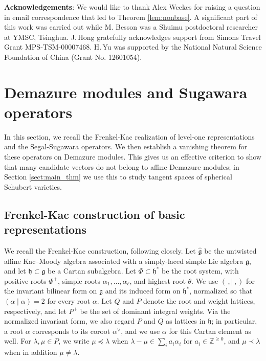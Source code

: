\documentclass[a4paper, 12pt]{amsart}
\theoremstyle{definition}
\begin{document}
 \vspace{0.2cm}

{\bf Acknowledgements}:   We would like to thank Alex Weekes for raising a question in email correspondence that led to Theorem \ref{lem:nonbase}. A significant part of this work was carried out while M. Besson was a Shuimu postdoctoral researcher at YMSC, Tsinghua. J.\,Hong gratefully acknowledges support from Simons
Travel Grant MPS-TSM-00007468.  H.\,Yu was supported by the National Natural Science Foundation of China (Grant No. 12601054).

\section{Demazure modules and Sugawara operators}

In this section, we recall the Frenkel-Kac realization of level-one representations
and the Segal-Sugawara operators.
We then establish a vanishing theorem for these operators on Demazure modules. This gives us an effective criterion to show that many candidate vectors do not belong to affine Demazure modules; in Section \ref{sect:main_thm} we use this to study tangent spaces of spherical Schubert varieties.
\label{sec:FK}


\subsection{Frenkel-Kac construction of  basic representations}\label{subsect:FK}

We recall the Frenkel-Kac construction, following
\cite[Chapter~14]{Kac} closely. Let $\hat{\mathfrak g}$ be the
untwisted affine Kac--Moody algebra associated with a
simply-laced simple Lie algebra $\mathfrak g$, and let
$\mathfrak h\subset \mathfrak g$ be a Cartan subalgebra. Let
$\Phi\subset\mathfrak h^*$ be the root system, with positive roots
$\Phi^+$, simple roots $\alpha_1,\ldots,\alpha_\ell$, and highest root
$\theta$. We use $(\,,\mid\,,)$ for the invariant bilinear form
on $\mathfrak g$ and its induced form on $\mathfrak h^*$, normalized so
that $(\alpha\mid \alpha)=2$ for every root $\alpha$.
Let $Q$ and $P$ denote the root and weight lattices, respectively, and
let $P^+$ be the set of dominant integral weights. Via the normalized
invariant form, we also regard $P$ and $Q$ as lattices in $\mathfrak h$;
in particular, a root $\alpha$ corresponds to its coroot $\alpha^\vee$,
and we use $\alpha$ for this Cartan element as well.
For $\lambda,\mu\in P$, we write $\mu\preceq\lambda$ when
$\lambda-\mu\in\sum_i a_i \alpha_i$ for $a_i \in \mathbb{Z}^{\geq 0}$, and $\mu\prec\lambda$
when in addition $\mu\neq\lambda$.
\end{document}
